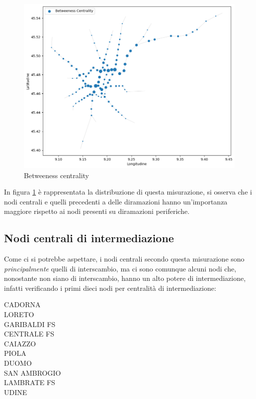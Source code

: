 \vspace{1em}
\begin{figure}[h!]
    \centering
    \includegraphics[width=0.8\linewidth]{Immagini//Capitoli//cap4/betw_centr.png}
    \caption{Betweeness centrality}
    \label{fig: Betweeness Centrality}
\end{figure}
\vspace{1em}

In figura \ref{fig: Betweeness Centrality} è rappresentata la distribuzione di questa misurazione, si osserva che i nodi centrali e quelli precedenti a delle diramazioni hanno un'importanza maggiore rispetto ai nodi presenti su diramazioni periferiche.

\subsection{Nodi centrali di intermediazione}
Come ci si potrebbe aspettare, i nodi centrali secondo questa misurazione sono \textit{principalmente} quelli di interscambio, ma ci sono comunque alcuni nodi che, nonostante non siano di interscambio, hanno un alto potere di intermediazione, infatti verificando i primi dieci nodi per centralità di intermediazione:

\begin{center}
CADORNA \\
LORETO \\
GARIBALDI FS \\
CENTRALE FS \\
CAIAZZO \\
PIOLA \\
DUOMO \\
SAN AMBROGIO \\
LAMBRATE FS \\
UDINE \\
\end{center}

